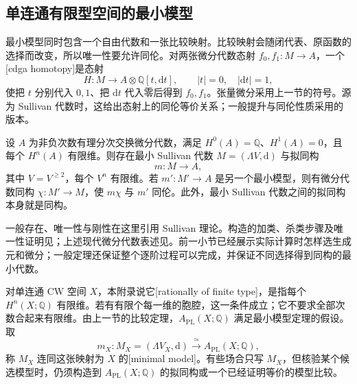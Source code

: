 \subsection{单连通有限型空间的最小模型}
\label{g2:subsec:E02:03}

最小模型同时包含一个自由代数和一张比较映射。比较映射会随闭代表、原函数的选择而改变，所以唯一性要允许同伦。对两张微分代数态射 \(f_0,f_1:M\to A\)，一个[cdga homotopy]是态射
\[
	H:M\longrightarrow A\otimes\mathbb Q[t,\mathrm dt],\qquad |t|=0,\quad |\mathrm dt|=1,
\]
使把 \(t\) 分别代入 \(0,1\)、把 \(\mathrm dt\) 代入零后得到 \(f_0,f_1\)。张量微分采用上一节的符号。源为 Sullivan 代数时，这给出态射上的同伦等价关系；一般提升与同伦性质采用\cite[第2节，第16页]{FelixHalperin2017SullivanModels}的版本。

\begin{theorem}\label{g2:thm:sullivan-minimal-model-existence}
	设 \(A\) 为非负次数有理分次交换微分代数，满足 \(H^0(A)=\mathbb Q\)、\(H^1(A)=0\)，且每个 \(H^n(A)\) 有限维。则存在最小 Sullivan 代数 \(M=(\Lambda V,\mathrm d)\) 与拟同构
	\[
		m:M\longrightarrow A,
	\]
	其中 \(V=V^{\ge2}\)，每个 \(V^n\) 有限维。若 \(m':M'\to A\) 是另一个最小模型，则有微分代数同构 \(\chi:M'\to M\)，使 \(m\chi\) 与 \(m'\) 同伦。此外，最小 Sullivan 代数之间的拟同构本身就是同构。
\end{theorem}

一般存在、唯一性与刚性在这里引用 Sullivan 理论。构造的加类、杀类步骤及唯一性证明见\cite[第5节第一种情形，第288—289页；第4节，命题4.2]{Sullivan1977Infinitesimal}；上述现代微分代数表述见\cite[第2节，定理2.1及随后注释，第16—17页；第7节例2，第22页]{FelixHalperin2017SullivanModels}。前一小节已经展示实际计算时怎样选生成元和微分；一般定理还保证整个逐阶过程可以完成，并保证不同选择得到同构的最小代数。

\ProseParagraphBreak

对单连通 CW 空间 \(X\)，本附录说它[rationally of finite type]，是指每个 \(H^n(X;\mathbb Q)\) 有限维。若有有限个每一维的胞腔，这一条件成立；它不要求全部次数合起来有限维。由上一节的比较定理，\(A_{\mathrm{PL}}(X;\mathbb Q)\) 满足最小模型定理的假设。取
\[
	m_X:M_X=(\Lambda V_X,\mathrm d)\xrightarrow{\ \simeq\ }A_{\mathrm{PL}}(X;\mathbb Q),
\]
称 \(M_X\) 连同这张映射为 \(X\) 的[minimal model]。有些场合只写 \(M_X\)，但核验某个候选模型时，仍须构造到 \(A_{\mathrm{PL}}(X;\mathbb Q)\) 的拟同构或一个已经证明等价的模型比较。

